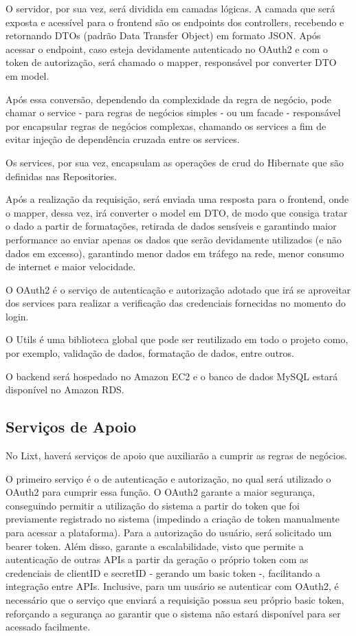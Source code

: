 O servidor, por sua vez, será dividida em camadas lógicas. A camada que será exposta e acessível para o frontend são os endpoints dos controllers, recebendo e retornando DTOs (padrão Data Transfer Object) em formato JSON. Após acessar o endpoint, caso esteja devidamente autenticado no OAuth2 e com o token de autorização, será chamado o mapper, responsável por converter DTO em model.

Após essa conversão, dependendo da complexidade da regra de negócio, pode chamar o service - para regras de negócios simples -  ou um facade - responsável por encapsular regras de negócios complexas, chamando os services a fim de evitar injeção de dependência cruzada entre os services. 

Os services, por sua vez, encapsulam as operações de \gls{crud} do Hibernate que são definidas nas Repositories.

Após a realização da requisição, será enviada uma resposta para o \gls{frontend}, onde o mapper, dessa vez, irá converter o model em DTO, de modo que consiga tratar o dado a partir de formatações, retirada de dados sensíveis e garantindo maior performance ao enviar apenas os dados que serão devidamente utilizados (e não dados em excesso), garantindo menor dados em tráfego na rede, menor consumo de internet e maior velocidade.

O OAuth2 é o serviço de autenticação e autorização adotado que irá se aproveitar dos services para realizar a verificação das credenciais fornecidas no momento do login.

O Utils é uma biblioteca global que pode ser reutilizado em todo o projeto como, por exemplo, validação de dados, formatação de dados, entre outros.

O backend será hospedado no Amazon EC2 e o banco de dados MySQL estará disponível no Amazon RDS.

\subsection{Serviços de Apoio}

No Lixt, haverá serviços de apoio que auxiliarão a cumprir as regras de negócios. 

O primeiro serviço é o de autenticação e autorização, no qual será utilizado o OAuth2 para cumprir essa função. O OAuth2 garante a maior segurança, conseguindo permitir a utilização do sistema a partir do token que foi previamente registrado no sistema (impedindo a criação de token manualmente para acessar a plataforma). Para a autorização do usuário, será solicitado um bearer token. Além disso, garante a escalabilidade, visto que permite a autenticação de outras \glspl{API} a partir da geração o próprio token com as credenciais de clientID e secretID - gerando um basic token -, facilitando a integração entre \glspl{API}. Inclusive, para um uusário se autenticar com OAuth2, é necessário que o serviço que enviará a requisição possua seu próprio basic token, reforçando a segurança ao garantir que o sistema não estará disponível para ser acessado facilmente.

